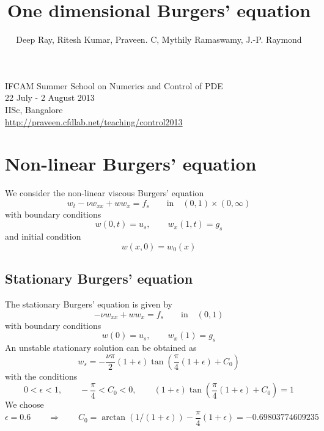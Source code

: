\documentclass[12pt]{article}
\title{One dimensional Burgers' equation}
\author{Deep Ray, Ritesh Kumar, Praveen. C, Mythily Ramaswamy, J.-P. Raymond}
\date{}
\begin{document}
\maketitle
\begin{center}
IFCAM Summer School on Numerics and Control of PDE\\
22 July - 2 August 2013\\
IISc, Bangalore\\
\url{http://praveen.cfdlab.net/teaching/control2013}
\end{center}

\section{Non-linear Burgers' equation}
We consider the non-linear viscous Burgers' equation
\begin{equation}
w_t -\nu w_{xx} + w w_x = f_s \qquad \mbox{in} \quad (0,1)\times (0,\infty)
\end{equation}
with boundary conditions
\begin{equation}
w(0,t) = u_s, \qquad w_x(1,t) = g_s
\end{equation}
and initial condition
\begin{equation}
w(x,0) = w_0(x)
\end{equation}

\subsection{Stationary Burgers' equation}
The stationary Burgers' equation is given by
\begin{equation}
-\nu w_{xx} + w w_x = f_s \qquad \mbox{in} \quad (0,1) 
\end{equation}
with boundary conditions
\begin{equation}
w(0) = u_s, \qquad w_x(1) = g_s
\end{equation}
An unstable stationary solution can be obtained as
\begin{equation}
 w_s = - \frac{\nu \pi}{2} (1 + \epsilon) \tan{\left( \frac{\pi}{4}(1+ \epsilon) + C_0 \right)}
\end{equation}
with the conditions
\[
 0 < \epsilon < 1, \qquad -\frac{\pi}{4} < C_0 < 0, \qquad (1 + \epsilon) \tan{\left( \frac{\pi}{4}(1+ \epsilon) + C_0 \right)} = 1
\]
We choose 
\[
\epsilon = 0.6 \qquad \Longrightarrow \qquad C_0 = \arctan(1/(1+\epsilon)) - \frac{\pi}{4}(1 + \epsilon) = -0.69803774609235
\]
\end{document}
